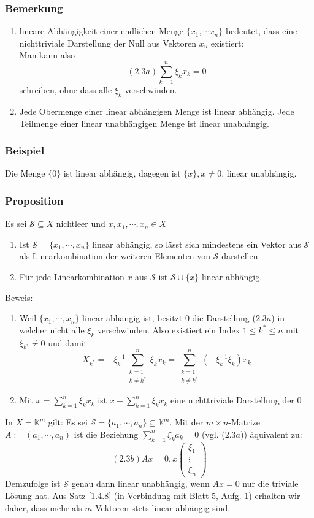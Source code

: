 \subsubsection{Bemerkung}
\renewcommand{\labelenumi}{(\arabic{enumi})}
\begin{enumerate}
\item lineare Abhängigkeit einer endlichen Menge $\{x_1,\cdots x_n\}$ bedeutet, dass eine nichttriviale Darstellung der Null aus Vektoren $x_u$ existiert:\\
Man kann also
\[(2.3a) \sum_{k=1}^n \xi _kx_k = 0\]
schreiben, ohne dass alle $\xi _k$ verschwinden.
\item Jede Obermenge einer linear abhängigen Menge ist linear abhängig.  Jede Teilmenge einer linear unabhängigen Menge ist linear unabhängig.
\end{enumerate}
\subsubsection{Beispiel}
Die Menge $\{0\}$ ist linear abhängig, dagegen ist $\{x\},x\not= 0$, linear unabhängig.
\subsubsection{Proposition}
Es sei $\mathcal{S}\subseteq X$ nichtleer und $x,x_1,\cdots ,x_n \in X$
\renewcommand{\labelenumi}{(\alph{enumi})}
\begin{enumerate}
\item Ist $\mathcal{S}=\{x_1, \cdots ,x_n\}$ linear abhängig, so lässt sich mindestens ein Vektor aus $\mathcal{S}$ als Linearkombination der weiteren Elementen von $\mathcal{S}$ darstellen.
\item Für jede Linearkombination $x$ aus $\mathcal{S}$ ist $\mathcal{S}\cup \{x\}$ linear abhängig.
\end{enumerate}
\underline{Beweis}:
\begin{enumerate}
\item Weil $\{x_1,\cdots ,x_n\}$ linear abhängig ist, besitzt $0$ die Darstellung ($2.3a$) in welcher nicht alle $\xi _k$ verschwinden.  Also existiert ein Index $1\leq k^*\leq n$ mit $\xi _{k^*} \not= 0$ und damit
\[X_{k^*} = -\xi _k^{-1} \sum_{\substack{k=1\\ k\not=k^*}}^n \xi _k x_k =\sum_{\substack{k=1\\ k\not=k^*}}^n (-\xi _k^{-1} \xi _k) x_k\]
\item Mit $x=\sum_{k=1}^n\xi _k x_k$ ist $x - \sum_{k=1}^n \xi _k x_k$ eine nichttriviale Darstellung der $0$
\end{enumerate}
In $X=\mathbb{K}^m$ gilt: Es sei $\mathcal{S}=\{a_1,\cdots ,a_n\}\subseteq \mathbb{K}^m$.  Mit der $m\times n$-Matrize $A:= (a_1,\cdots ,a_n)$ ist die Beziehung $\sum^n_{k=1} \xi _k a_k =0$ (vgl. ($2.3a$)) äquivalent zu:
\[ (2.3b) Ax=0, x\begin{pmatrix}\xi _1 \\ \vdots \\ \xi_n\end{pmatrix}\]
Demzufolge ist $\mathcal{S}$ genau dann linear unabhängig, wenn $Ax=0$ nur die triviale Lösung hat.  Aus \hyperref[1.4.8]{Satz \ref*{1.4.8}} (in Verbindung mit Blatt 5, Aufg. 1) erhalten wir daher, dass mehr als $m$ Vektoren stets linear abhängig sind.
